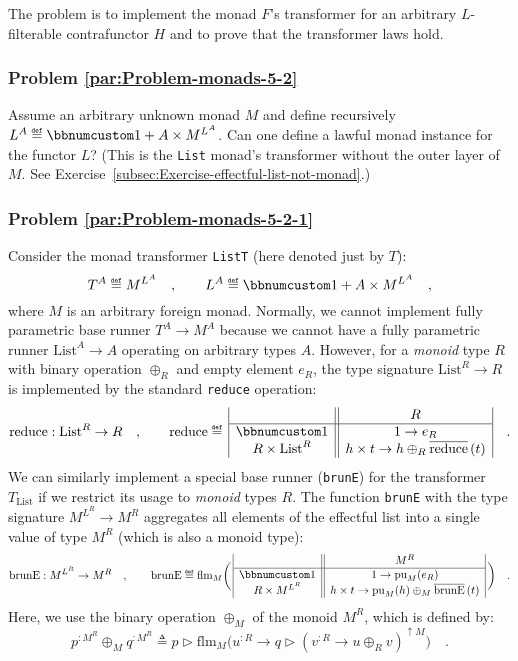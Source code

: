 The problem is to implement the monad $F$\textsf{'}s transformer for an arbitrary
$L$-filterable contrafunctor $H$ and to prove that the transformer
laws hold.

\subsubsection{Problem \label{par:Problem-monads-5-2}\ref{par:Problem-monads-5-2}}

Assume an arbitrary unknown monad $M$ and define recursively $L^{A}\triangleq\bbnum 1+A\times M^{L^{A}}$.
Can one define a lawful monad instance for the functor $L$? (This
is the \lstinline!List! monad\textsf{'}s transformer without the outer layer
of $M$. See Exercise~\ref{subsec:Exercise-effectful-list-not-monad}.)

\subsubsection{Problem \label{par:Problem-monads-5-2-1}\ref{par:Problem-monads-5-2-1}}

Consider the monad transformer \lstinline!ListT! (here denoted just
by $T$): 
\[
T^{A}\triangleq M^{L^{A}}\quad,\quad\quad L^{A}\triangleq\bbnum 1+A\times M^{L^{A}}\quad,
\]
where $M$ is an arbitrary foreign monad. Normally, we cannot implement
fully parametric base runner $T^{A}\rightarrow M^{A}$ because we
cannot have a fully parametric runner $\text{List}^{A}\rightarrow A$
operating on arbitrary types $A$. However, for a \emph{monoid} type
$R$ with binary operation $\oplus_{R}$ and empty element $e_{R}$,
the type signature $\text{List}^{R}\rightarrow R$ is implemented
by the standard \lstinline!reduce! operation: 
\[
\text{reduce}:\text{List}^{R}\rightarrow R\quad,\quad\quad\text{reduce}\triangleq\,\begin{array}{|c||c|}
 & R\\
\hline \bbnum 1 & 1\rightarrow e_{R}\\
R\times\text{List}^{R} & h\times t\rightarrow h\oplus_{R}\overline{\text{reduce}}\,(t)
\end{array}\quad.
\]
We can similarly implement a special base runner (\lstinline!brunE!)
for the transformer $T_{\text{List}}$ if we restrict its usage to
\emph{monoid} types $R$. The function \lstinline!brunE! with the
type signature $M^{L^{R}}\rightarrow M^{R}$ aggregates all elements
of the effectful list into a single value of type $M^{R}$ (which
is also a monoid type):
\[
\text{brunE}:M^{L^{R}}\rightarrow M^{R}\quad,\quad\quad\text{brunE}\triangleq\text{flm}_{M}\bigg(\,\begin{array}{|c||c|}
 & M^{R}\\
\hline \bbnum 1 & 1\rightarrow\text{pu}_{M}(e_{R})\\
R\times M^{L^{R}} & h\times t\rightarrow\text{pu}_{M}(h)\oplus_{M}\overline{\text{brunE}}\,(t)
\end{array}\,\bigg)\quad.
\]
Here, we use the binary operation $\oplus_{M}$ of the monoid $M^{R}$,
which is defined by:
\[
p^{:M^{R}}\oplus_{M}q^{:M^{R}}\triangleq p\triangleright\text{flm}_{M}\big(u^{:R}\rightarrow q\triangleright(v^{:R}\rightarrow u\oplus_{R}v)^{\uparrow M}\big)\quad.
\]

